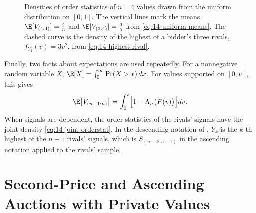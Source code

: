 \begin{figure}[htbp]
\centering
{}
\caption{Densities of order statistics of $n=4$ values drawn from the uniform distribution on $[0,1]$. The
vertical lines mark the means $\E[V_{(4:4)}]=\frac{4}{5}$ and $\E[V_{(3:4)}]=\frac{3}{5}$ from
\eqref{eq:14-uniform-means}. The dashed curve is the density of the highest of a bidder's three rivals,
$f_{Y_1}(v)=3v^2$, from \eqref{eq:14-highest-rival}.}
\label{fig:14-orderstat}
\end{figure}

Finally, two facts about expectations are used repeatedly. For a nonnegative random variable $X$,
$\E[X]=\int_0^\infty\Pr(X>x)\,dx$. For values supported on $[0,\bar v]$, this gives
\begin{equation}\label{eq:14-mean-second}
\E\bigl[V_{(n-1:n)}\bigr]=\int_0^{\bar v}\Bigl[1-\Lambda_n\bigl(F(v)\bigr)\Bigr]dv.
\end{equation}
When signals are dependent, the order statistics of the rivals' signals have the joint density
\eqref{eq:14-joint-orderstat}. In the descending notation of \citet{MilgromWeber1982}, $Y_k$ is the $k$-th
highest of the $n-1$ rivals' signals, which is $S_{(n-k:n-1)}$ in the ascending notation applied to the
rivals' sample.

\section{Second-Price and Ascending Auctions with Private Values}\label{sec:14-spa}

